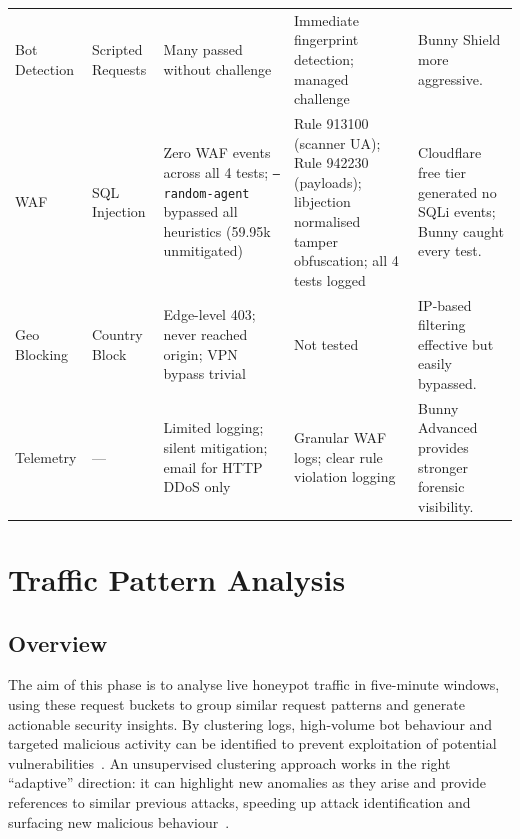 \documentclass[12pt, a4paper]{report}   %
\begin{document}
\begin{table}[H]
\begin{tabularx}{\textwidth}{@{}l l X X X@{}}
    Bot Detection & Scripted Requests
      & Many passed without challenge~\cite{cf-bot-fight}
      & Immediate fingerprint detection; managed 
        challenge~\cite{bunny-waf-docs}
      & Bunny Shield more aggressive. \\
    \addlinespace

    WAF & SQL Injection
      & Zero WAF events across all 4 tests; \texttt{--random-agent} 
        bypassed all heuristics (59.95k 
        unmitigated)~\cite{owasp-waf}
      & Rule 913100 (scanner UA); Rule 942230 (payloads); 
        libjection normalised tamper obfuscation; all 4 tests 
        logged~\cite{bunny-waf-docs,azure-waf-rules}
      & Cloudflare free tier generated no SQLi events; Bunny 
        caught every test. \\
    \addlinespace

    Geo Blocking & Country Block
      & Edge-level 403; never reached origin; VPN bypass 
        trivial~\cite{xvpn}
      & Not tested
      & IP-based filtering effective but easily bypassed. \\
    \addlinespace

    Telemetry & ---
      & Limited logging; silent mitigation; email for HTTP DDoS 
        only~\cite{cf-ddos}
      & Granular WAF logs; clear rule violation 
        logging~\cite{bunny-waf-docs}
      & Bunny Advanced provides stronger forensic visibility. \\

    \bottomrule
  \end{tabularx}
\end{table}

\chapter{Traffic Pattern Analysis}
\label{chap:traffic}

\section{Overview}

The aim of this phase is to analyse live honeypot traffic in five-minute windows,
using these request buckets to group similar request patterns and generate actionable
security insights. By clustering logs, high-volume bot behaviour and targeted
malicious activity can be identified to prevent exploitation of potential
vulnerabilities~\cite{ml-clustering-sec}. An unsupervised clustering approach works 
in the right ``adaptive'' direction: it can highlight new anomalies as they arise and 
provide references to similar previous attacks, speeding up attack identification and 
surfacing new malicious behaviour~\cite{concept-drift}.
\end{document}
